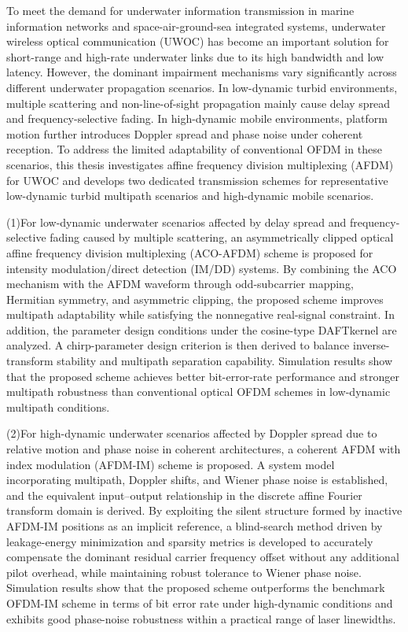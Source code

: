 \begin{abstractEn}
  To meet the demand for underwater information transmission in marine information networks and space-air-ground-sea integrated systems, underwater wireless optical communication (UWOC) has become an important solution for short-range and high-rate underwater links due to its high bandwidth and low latency. However, the dominant impairment mechanisms vary significantly across different underwater propagation scenarios. In low-dynamic turbid environments, multiple scattering and non-line-of-sight propagation mainly cause delay spread and frequency-selective fading. In high-dynamic mobile environments, platform motion further introduces Doppler spread and phase noise under coherent reception. To address the limited adaptability of conventional OFDM in these scenarios, this thesis investigates affine frequency division multiplexing (AFDM) for UWOC and develops two dedicated transmission schemes for representative low-dynamic turbid multipath scenarios and high-dynamic mobile scenarios.

  (1)For low-dynamic underwater scenarios affected by delay spread and frequency-selective fading caused by multiple scattering, an asymmetrically clipped optical affine frequency division multiplexing (ACO-AFDM) scheme is proposed for intensity modulation/direct detection (IM/DD) systems. By combining the ACO mechanism with the AFDM waveform through odd-subcarrier mapping, Hermitian symmetry, and asymmetric clipping, the proposed scheme improves multipath adaptability while satisfying the nonnegative real-signal constraint. In addition, the parameter design conditions under the cosine-type DAFTkernel are analyzed. A chirp-parameter design criterion is then derived to balance inverse-transform stability and multipath separation capability. Simulation results show that the proposed scheme achieves better bit-error-rate performance and stronger multipath robustness than conventional optical OFDM schemes in low-dynamic multipath conditions.

  (2)For high-dynamic underwater scenarios affected by Doppler spread due to relative motion and phase noise in coherent architectures, a coherent AFDM with index modulation (AFDM-IM) scheme is proposed. A system model incorporating multipath, Doppler shifts, and Wiener phase noise is established, and the equivalent input--output relationship in the discrete affine Fourier transform domain is derived. By exploiting the silent structure formed by inactive AFDM-IM positions as an implicit reference, a blind-search method driven by leakage-energy minimization and sparsity metrics is developed to accurately compensate the dominant residual carrier frequency offset without any additional pilot overhead, while maintaining robust tolerance to Wiener phase noise. Simulation results show that the proposed scheme outperforms the benchmark OFDM-IM scheme in terms of bit error rate under high-dynamic conditions and exhibits good phase-noise robustness within a practical range of laser linewidths.


\end{abstractEn}

